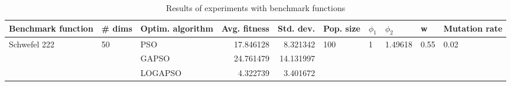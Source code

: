 \begin{table}
\centering
\caption{Results of experiments with benchmark functions}
\begin{tabular}{lllrrlllll}
\toprule
           Benchmark function &             \# dims & Optim. algorithm &  Avg. fitness &  Std. dev. &            Pop. size &         $\phi_{1}$ &               $\phi_{2}$ &                     w &         Mutation rate \\
\midrule
\multirow{3}{*}{Schwefel 222} & \multirow{3}{*}{50} &              PSO &     17.846128 &   8.321342 & \multirow{3}{*}{100} & \multirow{3}{*}{1} & \multirow{3}{*}{1.49618} & \multirow{3}{*}{0.55} & \multirow{3}{*}{0.02} \\
                              &                     &            GAPSO &     24.761479 &  14.131997 &                      &                    &                          &                       &                       \\
                              &                     &          LOGAPSO &      4.322739 &   3.401672 &                      &                    &                          &                       &                       \\
\bottomrule
\end{tabular}
\end{table}
